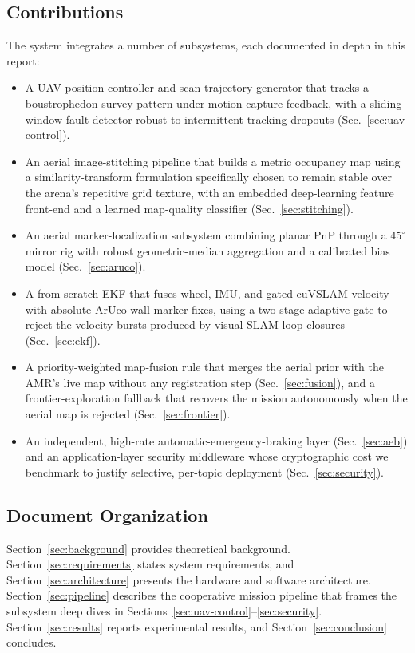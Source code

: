 \documentclass[conference]{IEEEtran}
\begin{document}
\subsection{Contributions}
The system integrates a number of subsystems, each documented in depth in this
report:
\begin{itemize}
  \item A UAV position controller and scan-trajectory generator that tracks a
        boustrophedon survey pattern under motion-capture feedback, with a
        sliding-window fault detector robust to intermittent tracking dropouts
        (Sec.~\ref{sec:uav-control}).
  \item An aerial image-stitching pipeline that builds a metric occupancy map
        using a similarity-transform formulation specifically chosen to remain
        stable over the arena's repetitive grid texture, with an embedded
        deep-learning feature front-end and a learned map-quality classifier
        (Sec.~\ref{sec:stitching}).
  \item An aerial marker-localization subsystem combining planar PnP through a
        $45^\circ$ mirror rig with robust geometric-median aggregation and a
        calibrated bias model (Sec.~\ref{sec:aruco}).
  \item A from-scratch EKF that fuses wheel, IMU, and gated cuVSLAM velocity with
        absolute ArUco wall-marker fixes, using a two-stage adaptive gate to reject
        the velocity bursts produced by visual-SLAM loop closures
        (Sec.~\ref{sec:ekf}).
  \item A priority-weighted map-fusion rule that merges the aerial prior with the
        AMR's live map without any registration step (Sec.~\ref{sec:fusion}), and a
        frontier-exploration fallback that recovers the mission autonomously when
        the aerial map is rejected (Sec.~\ref{sec:frontier}).
  \item An independent, high-rate automatic-emergency-braking layer
        (Sec.~\ref{sec:aeb}) and an application-layer security middleware whose
        cryptographic cost we benchmark to justify selective, per-topic
        deployment (Sec.~\ref{sec:security}).
\end{itemize}

\subsection{Document Organization}
Section~\ref{sec:background} provides theoretical background.
Section~\ref{sec:requirements} states system requirements, and
Section~\ref{sec:architecture} presents the hardware and software architecture.
Section~\ref{sec:pipeline} describes the cooperative mission pipeline that frames
the subsystem deep dives in Sections~\ref{sec:uav-control}--\ref{sec:security}.
Section~\ref{sec:results} reports experimental results, and
Section~\ref{sec:conclusion} concludes.
\end{document}
